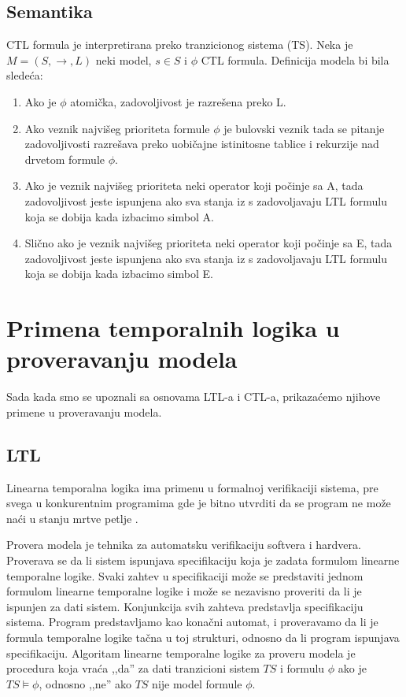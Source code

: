 \documentclass[a4paper]{article}
\begin{document}
{	\subsection{Semantika}
	\label{subsec:podnaslovN}
	CTL formula je interpretirana preko tranzicionog sistema (TS). Neka je $M = (S,\rightarrow, L)$ neki model, $s \in S$ i $\phi$ CTL formula.
	Definicija modela bi bila sledeća:
	\begin{enumerate}	
\item Ako je $\phi$ atomička, zadovoljivost je razrešena preko L.
\item  Ako veznik najvišeg prioriteta formule $\phi$ je bulovski veznik tada se pitanje zadovoljivosti razrešava
		   preko uobičajne istinitosne tablice i rekurzije nad drvetom formule $\phi$.
\item  Ako je veznik najvišeg prioriteta neki operator koji počinje sa A, tada zadovoljivost jeste ispunjena ako
		   sva stanja iz s zadovoljavaju LTL formulu koja se dobija kada izbacimo simbol A.
\item  Slično ako je veznik najvišeg prioriteta neki operator koji počinje sa E, tada zadovoljivost jeste ispunjena ako
		   sva stanja iz s zadovoljavaju LTL formulu koja se dobija kada izbacimo simbol E.
\end{enumerate}	

	\section{Primena temporalnih logika u proveravanju modela}
	\label{sec:MC}
	Sada kada smo se upoznali sa osnovama LTL-a i CTL-a, prikazaćemo njihove primene u proveravanju modela.
\subsection{LTL}
	\label{subsec:prLTL}
	Linearna temporalna logika ima primenu u formalnoj verifikaciji sistema, pre svega u konkurentnim programima gde je bitno utvrditi da se program ne može naći u stanju mrtve petlje \cite{baier2008principles}. 
	
	Provera modela je tehnika za automatsku verifikaciju softvera i hardvera. Proverava se da li sistem ispunjava specifikaciju koja je zadata formulom linearne temporalne logike. 
	Svaki zahtev u specifikaciji može se predstaviti jednom formulom linearne temporalne logike i može se nezavisno proveriti da li je ispunjen za dati sistem. Konjunkcija svih zahteva predstavlja specifikaciju sistema.
	Program predstavljamo kao konačni automat, i proveravamo da li je formula temporalne logike tačna u toj strukturi, odnosno da li program ispunjava specifikaciju.
	Algoritam linearne temporalne logike za proveru modela je procedura koja vraća ,,da'' za dati tranzicioni sistem $TS$ i formulu $\phi$ ako je $TS \vDash \phi$, odnosno ,,ne'' ako $TS$ nije model formule $\phi$.

}
\end{document}
